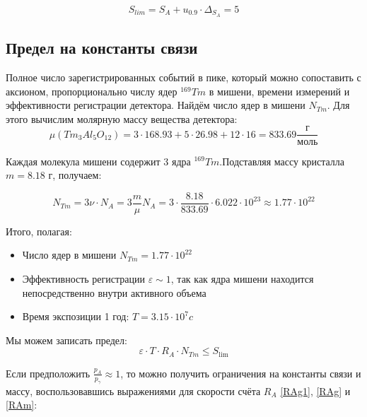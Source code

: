 \documentclass[a4paper,article,14pt]{extarticle}
\begin{document}
\begin{equation}
    S_{lim} = S_A + u_{0.9} \cdot \Delta_{S_A} = 5
\end{equation}

\subsection{Предел на константы связи}
Полное число зарегистрированных событий в пике, который можно сопоставить с аксионом, пропорционально числу ядер $^{169}Tm$ в мишени, времени измерений и эффективности регистрации детектора. Найдём число ядер в мишени ${N_{Tm}}$. Для этого вычислим молярную массу вещества детектора:
\begin{equation}
    \mu \left( {T{m_3}A{l_5}{O_{12}}} \right) = 3 \cdot 168.93 + 5 \cdot 26.98 + 12 \cdot 16 = 833.69\frac{\text{г}}{{\text{моль}}}
\end{equation}

Каждая молекула мишени содержит 3 ядра $^{169}Tm$.Подставляя массу кристалла $m= 8.18 \text{ г}$, получаем:

\begin{equation}
   {N_{Tm}} = 3\nu  \cdot {N_A} = 3\frac{m}{\mu }{N_A} = 3 \cdot \frac{{8.18}}{{833.69}} \cdot 6.022 \cdot {10^{23}} \approx 1.77 \cdot {10^{22}}
\end{equation}

Итого, полагая:
\begin{itemize}
    \item Число ядер в мишени $N_{Tm} = 1.77 \cdot {10^{22}}$
    \item Эффективность регистрации $\varepsilon \sim 1 $, так как ядра мишени находится непосредственно внутри активного объема
    \item Время экспозиции 1 год: $T = 3.15 \cdot {10^7} c$
\end{itemize}

Мы можем записать предел:
\begin{equation}
   \varepsilon  \cdot T \cdot {R_A} \cdot N_{Tm} \leqslant {S_{\lim }}
\end{equation}

Если предположить $\frac{{{p_A}}}{{{p_\gamma}}} \approx 1$, то можно получить ограничения на константы связи и массу, воспользовавшись выражениями для скорости счёта ${R_A}$ \eqref{RAg1}, \eqref{RAg} и \eqref{RAm}:
\end{document}
